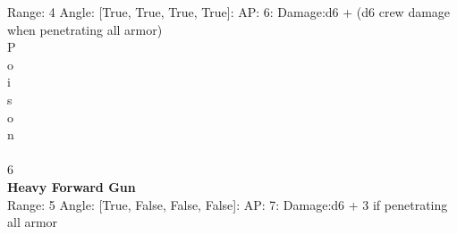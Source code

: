 Range: 4  Angle: [True, True, True, True]: AP: 6: Damage:d6 + (d6 crew damage when penetrating all armor) \\
P\\ 
o\\ 
i\\ 
s\\ 
o\\ 
n\\ 
 \\ 
6\\ 




{\bf Heavy Forward Gun } \\



Range: 5  Angle: [True, False, False, False]: AP: 7: Damage:d6 + 3 if penetrating all armor \\




 
\ \\




